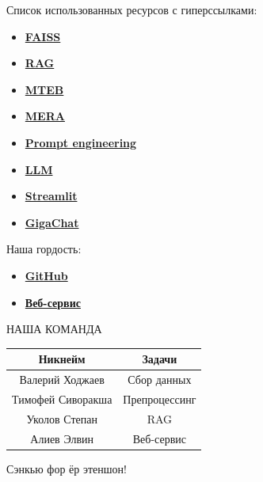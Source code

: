 \documentclass{article}
\begin{document}
Список использованных ресурсов с гиперссылками:
\begin{itemize}
    \item \textbf{\href{https://habr.com/ru/companies/okkamgroup/articles/509204/}{FAISS}}
    \item \textbf{\href{https://habr.com/ru/companies/raft/articles/791034/}{RAG}}
    \item \textbf{\href{https://huggingface.co/spaces/mteb/leaderboard}{MTEB}}
    \item \textbf{\href{https://mera.a-ai.ru/ru/leaderboard}{MERA}}
    \item \textbf{\href{https://www.promptingguide.ai/ru}{Prompt engineering}}
    \item \textbf{\href{https://habr.com/ru/companies/ods/articles/776478/}{LLM}}
    \item \textbf{\href{https://docs.streamlit.io/}{Streamlit}}
    \item \textbf{\href{https://habr.com/ru/companies/sberdevices/articles/865996/}{GigaChat}}
\end{itemize}




Наша гордость:
\begin{itemize}
    \item \textbf{\href{https://github.com/Y1OV/rag4rent}{GitHub}}
    \item \textbf{\href{http://83.143.66.61:27362/}{Веб-сервис}}
\end{itemize}


НАША КОМАНДА
\begin{table}[h!]
\centering
\begin{tabular}{|c|c|}
\hline
\textbf{Никнейм} & \textbf{Задачи} \\
\hline
Валерий Ходжаев & Сбор данных \\
\hline
Тимофей Сиворакша & Препроцессинг \\
\hline
Уколов Степан & RAG \\
\hline
Алиев Элвин & Веб-сервис \\
\hline
\end{tabular}
\end{table}


Сэнкью фор ёр этеншон!
\end{document}

